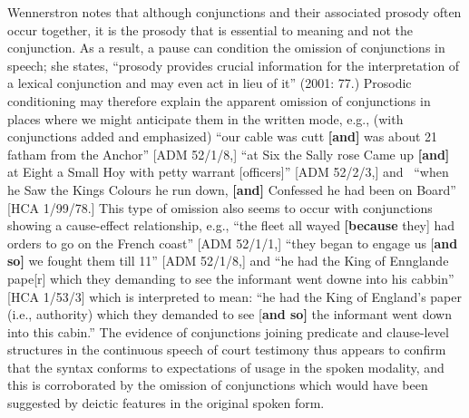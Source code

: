 \begin{styleStandard}
Wennerstron notes that although conjunctions and their associated prosody often occur together, it is the prosody that is essential to meaning and not the conjunction. As a result, a pause can condition the omission of conjunctions in speech; she states, “prosody provides crucial information for the interpretation of a lexical conjunction and may even act in lieu of it” (2001: 77.) Prosodic conditioning may therefore explain the apparent omission of conjunctions in places where we might anticipate them in the written mode, e.g., (with conjunctions added and emphasized) “our cable was cutt \textbf{[and]} was about 21 fatham from the Anchor” [ADM 52/1/8,] “at Six the Sally rose Came up \textbf{[and]} at Eight a Small Hoy with petty warrant [officers]” [ADM 52/2/3,] and \ “when he Saw the Kings Colours he run down, \textbf{[and]} Confessed he had been on Board” [HCA 1/99/78.] This type of omission also seems to occur with conjunctions showing a cause-effect relationship, e.g., “the fleet all wayed \textbf{[because }they] had orders to go on the French coast” [ADM 52/1/1,] “they began to engage us [\textbf{and so]} we fought them till 11” [ADM 52/1/8,] and “he had the King of Ennglande pape[r] which they demanding to see the informant went downe into his cabbin” [HCA 1/53/3] which is interpreted to mean: “he had the King of England’s paper (i.e., authority) which they demanded to see [\textbf{and so]} the informant went down into this cabin.” The evidence of conjunctions joining predicate and clause-level structures in the continuous speech of court testimony thus appears to confirm that the syntax conforms to expectations of usage in the spoken modality, and this is corroborated by the omission of conjunctions which would have been suggested by deictic features in the original spoken form. 
\end{styleStandard}

